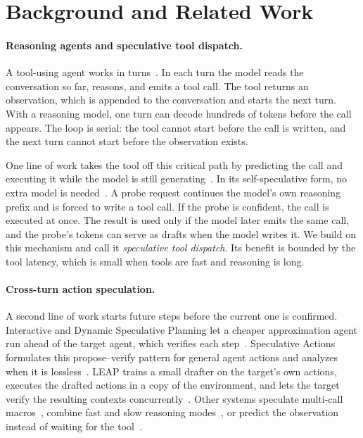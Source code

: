 \section{Background and Related Work}
\label{sec:background}

\paragraph{Reasoning agents and speculative tool dispatch.}
A tool-using agent works in turns~\citep{yao2023react}.
In each turn the model reads the conversation so far, reasons, and emits a tool call.
The tool returns an observation, which is appended to the conversation and starts the next turn.
With a reasoning model, one turn can decode hundreds of tokens before the call appears.
The loop is serial: the tool cannot start before the call is written, and the next turn cannot start before the observation exists.

One line of work takes the tool off this critical path by predicting the call and executing it while the model is still generating~\citep{nichols2025speculative,sui2026paste,huang2025spagent,li2026specmemory,bai2026spork}.
In its self-speculative form, no extra model is needed~\citep{bai2026spork}.
A probe request continues the model's own reasoning prefix and is forced to write a tool call.
If the probe is confident, the call is executed at once.
The result is used only if the model later emits the same call, and the probe's tokens can serve as drafts when the model writes it.
We build on this mechanism and call it \emph{speculative tool dispatch}.
Its benefit is bounded by the tool latency, which is small when tools are fast and reasoning is long.

\paragraph{Cross-turn action speculation.}
A second line of work starts future steps before the current one is confirmed.
Interactive and Dynamic Speculative Planning let a cheaper approximation agent run ahead of the target agent, which verifies each step~\citep{hua2024isp,guan2025dsp}.
Speculative Actions formulates this propose--verify pattern for general agent actions and analyzes when it is lossless~\citep{ye2026speculative}.
LEAP trains a small drafter on the target's own actions, executes the drafted actions in a copy of the environment, and lets the target verify the resulting contexts concurrently~\citep{xu2026leap}.
Other systems speculate multi-call macros~\citep{liu2026smc}, combine fast and slow reasoning modes~\citep{zhong2026dualspec}, or predict the observation instead of waiting for the tool~\citep{chen2026aospec,montgomery2026obsspec}.

